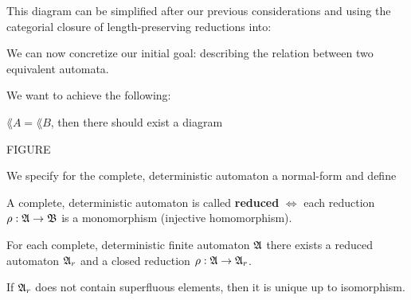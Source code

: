 \begin{center}
\end{center}

This diagram can be simplified after our previous considerations and using the
categorial closure of length-preserving reductions into:

\begin{center}
\end{center}

We can now concretize our initial goal: describing the relation between
two equivalent automata.

We want to achieve the following:

$\lang{A} = \lang{B}$, then there should exist a diagram

FIGURE

We specify for the complete, deterministic automaton a normal-form and define

\begin{definition}
A complete, deterministic automaton is called {\bf reduced} $\iff$ each
reduction $\rho : \mbox{$\mathfrak{A}$} \to \mbox{$\mathfrak{B}$}$ is a monomorphism (injective homomorphism).
\end{definition}

\begin{lemma}
For each complete, deterministic finite automaton $\mbox{$\mathfrak{A}$}$ there exists a
reduced automaton $\mbox{$\mathfrak{A}$}_r$ and a closed reduction $\rho : \mbox{$\mathfrak{A}$} \to
\mbox{$\mathfrak{A}$}_r$.

If $\mbox{$\mathfrak{A}$}_r$ does not contain superfluous elements, then it is unique up to
isomorphism.
\end{lemma}

